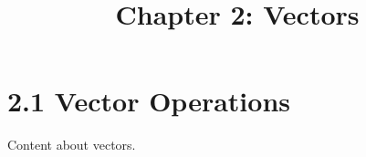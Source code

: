 \documentclass{article}
\title{Chapter 2: Vectors}
\begin{document}
\section{2.1 Vector Operations}
Content about vectors.
\end{document}
